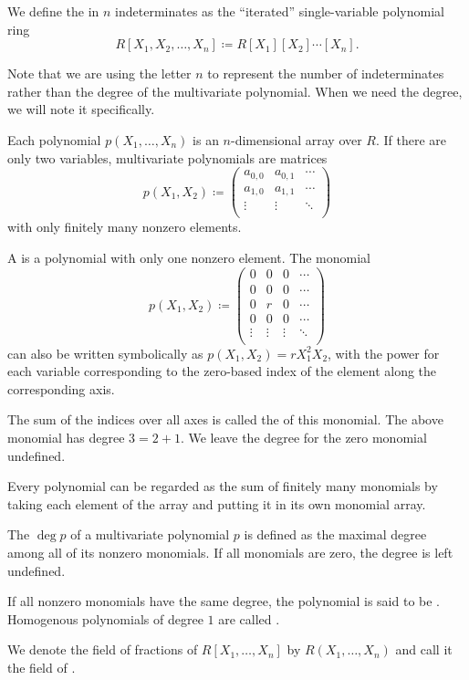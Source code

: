 \begin{definition}\label{def:multivariate_polynomial}
  We define the  in \( n \) indeterminates as the \enquote{iterated} single-variable polynomial ring
  \begin{equation*}
    R[X_1, X_2, \ldots, X_n] \coloneqq R[X_1][X_2] \cdots [X_n].
  \end{equation*}

  Note that we are using the letter \( n \) to represent the number of indeterminates rather than the degree of the multivariate polynomial. When we need the degree, we will note it specifically.

  Each polynomial \( p(X_1, \ldots, X_n) \) is an \( n \)-dimensional array over \( R \). If there are only two variables, multivariate polynomials are matrices
  \begin{equation*}
    p(X_1, X_2) \coloneqq \begin{pmatrix}
      a_{0,0} & a_{0,1} & \cdots \\
      a_{1,0} & a_{1,1} & \cdots \\
      \vdots  & \vdots  & \ddots \\
    \end{pmatrix}
  \end{equation*}
  with only finitely many nonzero elements.

  A  is a polynomial with only one nonzero element. The monomial
  \begin{equation*}
    p(X_1, X_2) \coloneqq \begin{pmatrix}
      0       & 0       & 0       & \cdots \\
      0       & 0       & 0       & \cdots \\
      0       & r       & 0       & \cdots \\
      0       & 0       & 0       & \cdots \\
      \vdots  & \vdots  & \vdots  & \ddots \\
    \end{pmatrix}
  \end{equation*}
  can also be written symbolically as \( p(X_1, X_2) = r X_1^2 X_2 \), with the power for each variable corresponding to the zero-based index of the element along the corresponding axis.

  The sum of the indices over all axes is called the  of this monomial. The above monomial has degree \( 3 = 2 + 1 \). We leave the degree for the zero monomial undefined.

  Every polynomial can be regarded as the sum of finitely many monomials by taking each element of the array and putting it in its own monomial array.

  The  \( \deg p \) of a multivariate polynomial \( p \) is defined as the maximal degree among all of its nonzero monomials. If all monomials are zero, the degree is left undefined.

  If all nonzero monomials have the same degree, the polynomial is said to be . Homogenous polynomials of degree \( 1 \) are called .
\end{definition}

\begin{definition}\label{def:rational_algebraic_function}
  We denote the field of fractions of \( R[X_1, \ldots, X_n] \) by \( R(X_1, \ldots, X_n) \) and call it the field of .
\end{definition}
